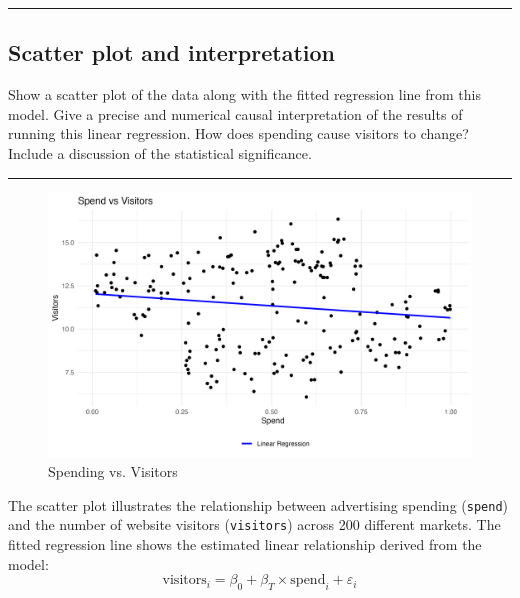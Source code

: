 \documentclass{article}
\newenvironment{colorparagraph}[1]{\par\color{#1}}{\par}
\begin{document}
\begin{colorparagraph}{questioncolor}
\rule{\textwidth}{0.5pt}

\label{q4a}\subsection{Scatter plot and interpretation}
Show a scatter plot of the data along with the fitted regression line from this model. Give a precise and numerical causal interpretation of the results of running this linear regression. How does spending cause visitors to change? Include a discussion of the statistical significance.

\rule{\textwidth}{0.5pt}
\end{colorparagraph}

\begin{figure}[H]
  \centering
  \includegraphics[width=\textwidth]{marketing_spending_vs_visitors.png}
  \caption{Spending vs. Visitors}
  \label{fig:your_image_label}
\end{figure}

The scatter plot illustrates the relationship between advertising spending (\texttt{spend}) and the number of website visitors (\texttt{visitors}) across 200 different markets. The fitted regression line shows the estimated linear relationship derived from the model:
\[
\text{visitors}_i = \beta_0 + \beta_T \times \text{spend}_i + \varepsilon_i
\]
\end{document}
